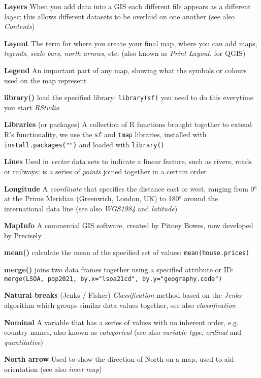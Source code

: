 \documentclass[a4paper,10pt]{article}
\begin{document}
\begin{multicols}{2}
\textbf{Layers} When you add data into a GIS each different file appears as a different \textit{layer}; this allows different datasets to be overlaid on one another (see also \textit{Contents})

\textbf{Layout} The term for where you create your final map, where you can add maps, \textit{legends}, \textit{scale bars}, \textit{north arrows}, etc. (also known as \textit{Print Layout}, for QGIS)

\textbf{Legend} An important part of any map, showing what the symbols or colours used on the map represent 

\textbf{library()} load the specified library: \texttt{library(sf)} you need to do this everytime you start \textit{RStudio}

\textbf{Libraries} (or packages) A collection of R functions brought together to extend R's functionality, we use the \texttt{sf} and \texttt{tmap} libraries, installed with \texttt{install.packages("")} and loaded with \texttt{library()}

\textbf{Lines} Used in \textit{vector} data sets to indicate a linear feature, such as rivers, roads or railways; is a series of \textit{points} joined together in a certain order

\textbf{Longitude} A \textit{coordinate} that specifies the distance east or west, ranging from \ang{0} at the Prime Meridian (Greenwich, London, UK) to \ang{180} around the international data line (see also \textit{WGS1984} and \textit{latitude})

\textbf{MapInfo} A commercial GIS software, created by Pitney Bowes, now developed by Precisely 

\textbf{mean()} calculate the mean of the specified set of values: \texttt{mean(house.prices)}

\textbf{merge()} joins two data frames together using a specified attribute or ID: \texttt{merge(LSOA, pop2021, by.x="lsoa21cd", by.y="geography.code")}

\textbf{Natural breaks} (Jenks / Fisher) \textit{Classification} method based on the \textit{Jenks} algorithm which groups similar data values together, see also \textit{classification}

\textbf{Nominal} A variable that has a series of values with no inherent order, e.g. country names, also known as \textit{categorical} (see also \textit{variable type}, \textit{ordinal} and \textit{quantitative})

\textbf{North arrow} Used to show the direction of North on a map, used to aid orientation (see also \textit{inset map})


\end{multicols}
\end{document}
